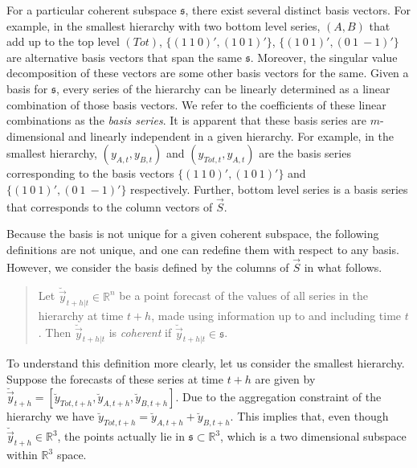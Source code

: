 \documentclass[graybox]{svmult}
\begin{document}
For a particular coherent subspace $\mathfrak{s}$, there exist several distinct basis vectors. For example, in the smallest hierarchy with two bottom level series, $(A, B)$ that add up to the top level $(Tot)$, 
$\{(1 ~1 ~0)', (1 ~0 ~1)'\}$, 
$\{(1 ~ 0 ~ 1)',(0~1~-\!\!1)'\}$ are alternative basis vectors that span the same $\mathfrak{s}$. Moreover, the singular value decomposition of these vectors are some other basis vectors for the same. Given a basis for $\mathfrak{s}$, every series of the hierarchy can be linearly determined as a linear combination of those basis vectors. We refer to the coefficients of these linear combinations as the \textit{basis series}. It is apparent that these basis series are $m$-dimensional and linearly independent in a given hierarchy. For example, in the smallest hierarchy, $(y_{A,t}, y_{B,t})$ and $(y_{Tot,t},y_{A,t})$ are the basis series corresponding to the basis vectors 
$\{(1 ~1 ~0)', (1 ~0 ~1)'\}$ and 
$\{(1 ~ 0 ~ 1)',(0~1~-\!\!1)'\}$
respectively. Further, bottom level series is a basis series that corresponds to the column vectors of $\vec{S}$. 

Because the basis is not unique for a given coherent subspace, the following definitions are not unique, and one can redefine them with respect to any basis. However, we consider the basis defined by the columns of $\vec{S}$ in what follows.

\begin{quotation}
\begin{definition}\label{def:cohpoint}
	\item[] Let $\breve{\vec{y}}_{t+h|t} \in \mathbb{R}^n$ be a point forecast of the values of all series in the hierarchy at time $t+h$, made using information up to and including time $t$. Then $\breve{\vec{y}}_{t+h|t}$ is \emph{coherent} if $\breve{\vec{y}}_{t+h|t} \in \mathfrak{s}$.
\end{definition}
\end{quotation}

To understand this definition more clearly, let us consider the smallest hierarchy. Suppose the forecasts of these series at time $t+h$ are given by $\breve{\vec{y}}_{t+h} = [\breve{y}_{Tot,t+h},\breve{y}_{A,t+h}, \breve{y}_{B,t+h}]$. Due to the aggregation constraint of the hierarchy we have $\breve{y}_{Tot,t+h}=\breve{y}_{A,t+h}+\breve{y}_{B,t+h}$. This implies that, even though  $\breve{\vec{y}}_{t+h} \in \mathbb{R}^3$, the points actually lie in $\mathfrak{s}\subset \mathbb{R}^3$, which is a two dimensional subspace within $\mathbb{R}^3$ space.
\end{document}
